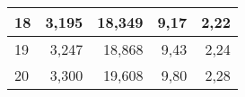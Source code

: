 {\begin{center}
\begin{tabular}{|l|r|r|r|r|}
18 & 3,195                                                                            & 18,349                                                                                                                         & 9,17                                                                                                                                             & 2,22                                           \\ \hline
19 & 3,247                                                                            & 18,868                                                                                                                         & 9,43                                                                                                                                             & 2,24                                           \\ \hline
20 & 3,300                                                                            & 19,608                                                                                                                         & 9,80                                                                                                                                             & 2,28                                           \\ \hline
\end{tabular}
\end{center}
}
